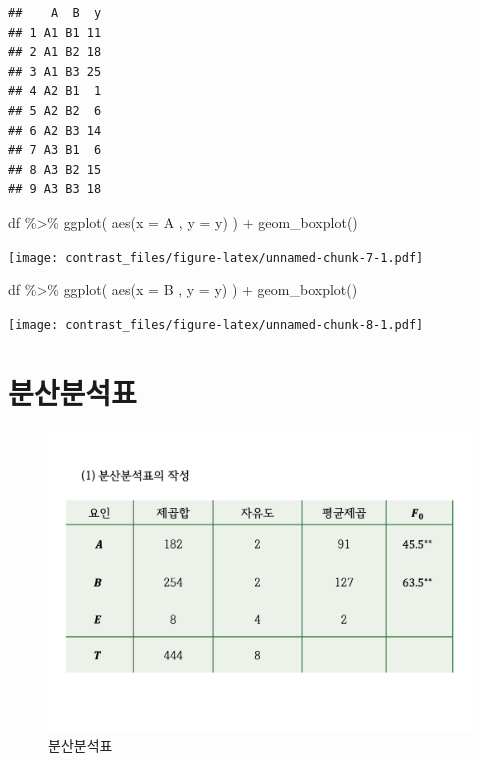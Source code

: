 \documentclass[
]{book}
\newenvironment{Shaded}{\begin{snugshade}}{\end{snugshade}}
\newcommand{\AttributeTok}[1]{\textcolor[rgb]{0.77,0.63,0.00}{#1}}
\newcommand{\FunctionTok}[1]{\textcolor[rgb]{0.00,0.00,0.00}{#1}}
\newcommand{\NormalTok}[1]{#1}
\newcommand{\SpecialCharTok}[1]{\textcolor[rgb]{0.00,0.00,0.00}{#1}}
\begin{document}
\begin{verbatim}
##    A  B  y
## 1 A1 B1 11
## 2 A1 B2 18
## 3 A1 B3 25
## 4 A2 B1  1
## 5 A2 B2  6
## 6 A2 B3 14
## 7 A3 B1  6
## 8 A3 B2 15
## 9 A3 B3 18
\end{verbatim}

\begin{Shaded}
\begin{Highlighting}[]
\NormalTok{df }\SpecialCharTok{\%\textgreater{}\%}  \FunctionTok{ggplot}\NormalTok{( }\FunctionTok{aes}\NormalTok{(}\AttributeTok{x =}\NormalTok{ A , }\AttributeTok{y =}\NormalTok{ y) ) }\SpecialCharTok{+}  \FunctionTok{geom\_boxplot}\NormalTok{()}
\end{Highlighting}
\end{Shaded}

\texttt{[image: contrast\_files/figure-latex/unnamed-chunk-7-1.pdf]}

\begin{Shaded}
\begin{Highlighting}[]
\NormalTok{df }\SpecialCharTok{\%\textgreater{}\%}  \FunctionTok{ggplot}\NormalTok{( }\FunctionTok{aes}\NormalTok{(}\AttributeTok{x =}\NormalTok{ B , }\AttributeTok{y =}\NormalTok{ y) ) }\SpecialCharTok{+}  \FunctionTok{geom\_boxplot}\NormalTok{()}
\end{Highlighting}
\end{Shaded}

\texttt{[image: contrast\_files/figure-latex/unnamed-chunk-8-1.pdf]}

\hypertarget{uxbd84uxc0b0uxbd84uxc11duxd45c}{%
\section{분산분석표}\label{uxbd84uxc0b0uxbd84uxc11duxd45c}}

\begin{figure}
\centering
\includegraphics{slide02.png}
\caption{분산분석표}
\end{figure}
\end{document}
